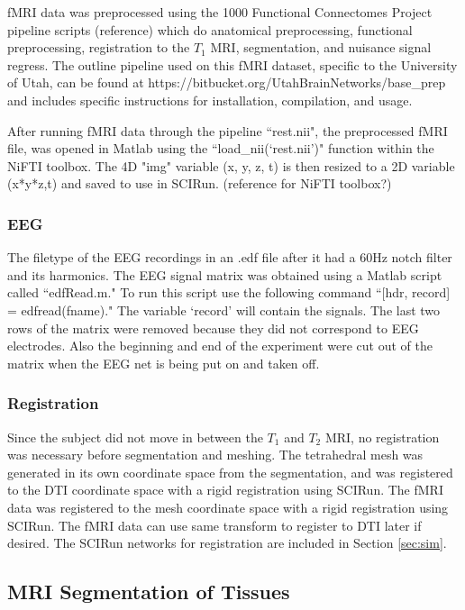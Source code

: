 fMRI data was preprocessed using the 1000 Functional Connectomes Project pipeline scripts (reference) which do anatomical preprocessing, functional preprocessing, registration to the $T_1$ MRI, segmentation, and nuisance signal regress. The outline pipeline used on this fMRI dataset, specific to the University of Utah, can be found at https://bitbucket.org/UtahBrainNetworks/base\_prep and includes specific instructions for installation, compilation, and usage.  

After running fMRI data through the pipeline ``rest.nii", the preprocessed fMRI file, was opened in Matlab using the ``load\_nii(`rest.nii')" function within the NiFTI toolbox. The 4D "img" variable (x, y, z, t) is then resized to a 2D variable (x*y*z,t) and saved to use in SCIRun. (reference for NiFTI toolbox?)

\subsubsection{EEG}

The filetype of the EEG recordings in an .edf file after it had a 60Hz notch filter and its harmonics. The EEG signal matrix was obtained using a Matlab script called ``edfRead.m." To run this script use the following command ``[hdr, record] = edfread(fname)." The variable `record' will contain the signals. The last two rows of the matrix were removed because they did not correspond to EEG electrodes. Also the beginning and end of the experiment were cut out of the matrix when the EEG net is being put on and taken off. 

\subsubsection{Registration}

Since the subject did not move in between the $T_1$ and $T_2$ MRI, no registration was necessary before segmentation and meshing. The tetrahedral mesh was generated in its own coordinate space from the segmentation, and was registered to the DTI coordinate space with a rigid registration using SCIRun. The fMRI data was registered to the mesh coordinate space with a rigid registration using SCIRun. The fMRI data can use same transform to register to DTI later if desired. The SCIRun networks for registration are included in Section \ref{sec:sim}.

\subsection{MRI Segmentation of Tissues}
\label{sec:Seg}

